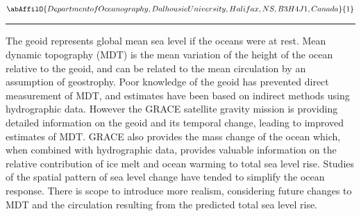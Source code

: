 \begin{minipage}{\linewidth}\begin{center}\begin{minipage}{\linewidth}
   \vspace{2 mm} \begin{center}
    \vspace{2 mm}\begin{center}
  
  $\abAffilO{Department of Oceanography, Dalhousie University, Halifax, NS, B3H 4J1, Canada}{1}$

  \end{center}
  \vspace{2 mm}
  \end{center}\end{minipage}\end{center}
  \begin{center}\rule{0.70\linewidth}{0.5 pt}\end{center}
  \begin{minipage}{\linewidth}
\noindent The geoid represents global mean sea level if the oceans were at rest. Mean dynamic topography (MDT) is the mean variation of the height of the ocean relative to the geoid, and can be related to the mean circulation by an assumption of geostrophy. Poor knowledge of the geoid has prevented direct measurement of MDT, and estimates have been based on indirect methods using hydrographic data. However the GRACE satellite gravity mission is providing detailed information on the geoid and its temporal change, leading to improved estimates of MDT. GRACE also provides the mass change of the ocean which, when combined with hydrographic data, provides valuable information on the relative contribution of ice melt and ocean warming to total sea level rise. Studies of the spatial pattern of sea level change have tended to simplify the ocean response. There is scope to introduce more realism, considering future changes to MDT and the circulation resulting from the predicted total sea level rise.
\end{minipage}\end{minipage}
